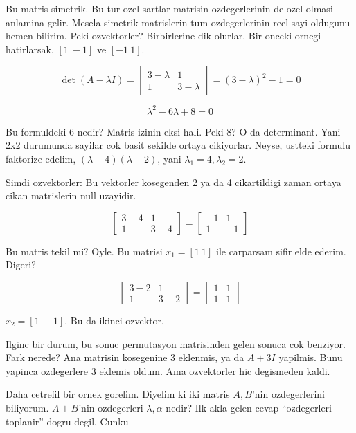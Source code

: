 \documentclass[12pt,fleqn]{article}\usepackage{../common}
\begin{document}
Bu matris simetrik. Bu tur ozel sartlar matrisin ozdegerlerinin de ozel
olmasi  anlamina gelir. Mesela simetrik matrislerin tum ozdegerlerinin reel
sayi oldugunu hemen bilirim. Peki ozvektorler? Birbirlerine dik
olurlar. Bir onceki ornegi hatirlarsak, $[1 \ -1]$ ve $[-1 \ 1]$. 

$$ 
\det (A -\lambda I) = 
\left[\begin{array}{ccc}
3-\lambda & 1 \\ 
1 & 3-\lambda
\end{array}\right] = 
(3-\lambda)^2 -1 = 0
$$

$$ \lambda^2 - 6\lambda + 8 = 0 $$

Bu formuldeki $6$ nedir? Matris izinin eksi hali. Peki 8? O da
determinant. Yani 2x2 durumunda sayilar cok basit sekilde ortaya
cikiyorlar. Neyse, ustteki formulu faktorize edelim, $(\lambda - 4)(\lambda
- 2)$, 
yani $\lambda_1 = 4,\lambda_2 = 2$. 

Simdi ozvektorler: Bu vektorler kosegenden 2 ya da 4 cikartildigi zaman
ortaya cikan matrislerin null uzayidir. 

$$ 
\left[\begin{array}{ccc}
3-4 & 1 \\ 1 & 3-4
\end{array}\right] = 
\left[\begin{array}{ccc}
-1 & 1 \\ 1 & -1
\end{array}\right]
 $$

Bu matris tekil mi? Oyle. Bu matrisi $x_1 = [1 \ 1]$ ile carparsam sifir elde
ederim. Digeri?

$$ 
\left[\begin{array}{ccc}
3-2 & 1 \\ 1 & 3-2
\end{array}\right] = 
\left[\begin{array}{ccc}
1 & 1 \\ 1 & 1
\end{array}\right]
 $$

$x_2 = [1 \ -1]$. Bu da ikinci ozvektor.

Ilginc bir durum, bu sonuc permutasyon matrisinden gelen sonuca cok
benziyor. Fark nerede? Ana matrisin kosegenine 3 eklenmis, ya da $A + 3I$
yapilmis. Bunu yapinca ozdegerlere 3 eklemis oldum. Ama ozvektorler hic
degismeden kaldi.

Daha cetrefil bir ornek gorelim. Diyelim ki iki matris $A,B$'nin
ozdegerlerini biliyorum. $A+B$'nin ozdegerleri $\lambda,\alpha$ nedir?  Ilk
akla gelen cevap ``ozdegerleri toplanir'' dogru degil. Cunku
\end{document}
